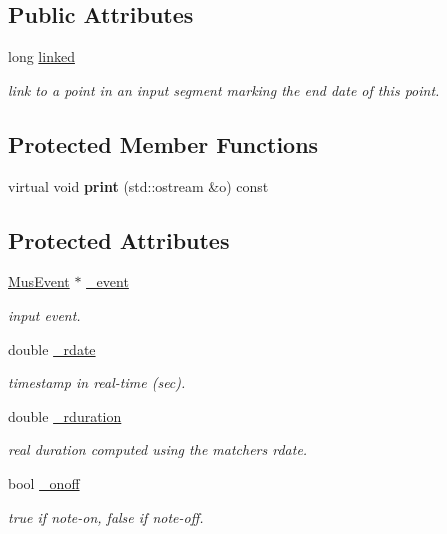 \subsection*{Public Attributes}
\begin{DoxyCompactItemize}
\item 
long \mbox{\hyperlink{classPoint_a11ca880bad16051872c032fa47b73e42}{linked}}
\begin{DoxyCompactList}\small\item\em link to a point in an input segment marking the end date of this point. \end{DoxyCompactList}\end{DoxyCompactItemize}
\subsection*{Protected Member Functions}
\begin{DoxyCompactItemize}
\item 
virtual void {\bfseries print} (std\+::ostream \&o) const
\end{DoxyCompactItemize}
\subsection*{Protected Attributes}
\begin{DoxyCompactItemize}
\item 
\mbox{\label{classPoint_abd14c2ceaca50fcb7c8236b8ce0d9aa6}} 
\mbox{\hyperlink{classMusEvent}{Mus\+Event}} $\ast$ \mbox{\hyperlink{classPoint_abd14c2ceaca50fcb7c8236b8ce0d9aa6}{\+\_\+event}}
\begin{DoxyCompactList}\small\item\em input event. \end{DoxyCompactList}\item 
\mbox{\label{classPoint_a650144f8bb470d6d4e364d7082d77f57}} 
double \mbox{\hyperlink{classPoint_a650144f8bb470d6d4e364d7082d77f57}{\+\_\+rdate}}
\begin{DoxyCompactList}\small\item\em timestamp in real-\/time (sec). \end{DoxyCompactList}\item 
double \mbox{\hyperlink{classPoint_a706ce56822f7e26dc66d67ce225d8a94}{\+\_\+rduration}}
\begin{DoxyCompactList}\small\item\em real duration computed using the matcher\textquotesingle{}s rdate. \end{DoxyCompactList}\item 
bool \mbox{\hyperlink{classPoint_a5508dcf134387f3f2271e95b578f3e3a}{\+\_\+onoff}}
\begin{DoxyCompactList}\small\item\em true if note-\/on, false if note-\/off. \end{DoxyCompactList}\end{DoxyCompactItemize}
